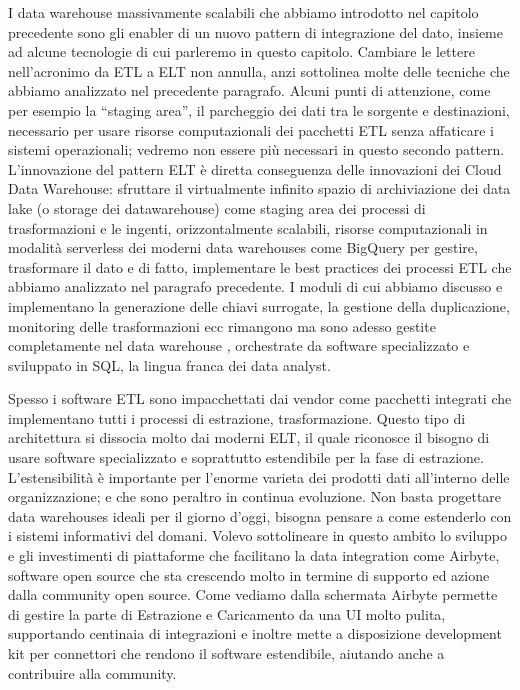\documentclass[a4paper,12pt]{report}
\begin{document}
I data warehouse massivamente scalabili che abbiamo introdotto nel capitolo precedente sono gli enabler di un nuovo pattern di integrazione del dato, insieme ad alcune tecnologie di cui parleremo in questo capitolo.
Cambiare le lettere nell’acronimo da ETL a ELT non annulla, anzi sottolinea molte delle tecniche che abbiamo analizzato nel precedente paragrafo.
\noindent
Alcuni punti di attenzione, come per esempio la “staging area”, il parcheggio dei dati tra le sorgente e destinazioni, necessario per usare risorse computazionali dei pacchetti ETL senza affaticare i sistemi operazionali; vedremo non essere più necessari in questo secondo pattern.
\noindent
L’innovazione del pattern ELT è diretta conseguenza delle innovazioni dei Cloud Data Warehouse: sfruttare il virtualmente infinito spazio di archiviazione dei data lake (o storage dei datawarehouse) come staging area dei processi di trasformazioni e le ingenti, orizzontalmente scalabili,  risorse computazionali in modalità serverless dei moderni data warehouses come BigQuery per gestire, trasformare il dato e di fatto, implementare le best practices dei processi ETL che abbiamo analizzato nel paragrafo precedente.
\noindent
I moduli di cui abbiamo discusso e implementano la generazione delle chiavi surrogate, la gestione della duplicazione, monitoring delle trasformazioni ecc rimangono ma sono adesso gestite completamente nel data warehouse , orchestrate da software specializzato e sviluppato in SQL, la lingua franca dei data analyst.

\noindent
Spesso i software ETL sono impacchettati dai vendor come pacchetti integrati che implementano tutti i processi di estrazione, trasformazione. Questo tipo di architettura si dissocia molto dai moderni ELT, il quale riconosce il bisogno di usare software specializzato e soprattutto estendibile per la fase di estrazione. L’estensibilità è importante per l’enorme varieta dei prodotti dati all’interno delle organizzazione; e che sono peraltro in continua evoluzione.
Non basta progettare data warehouses ideali per il giorno d’oggi, bisogna pensare a come estenderlo con i sistemi informativi del domani.
Volevo sottolineare in questo ambito lo sviluppo e gli investimenti di piattaforme che facilitano la data integration come Airbyte, software open source che sta crescendo molto in termine di supporto ed azione dalla community open source.
Come vediamo dalla schermata Airbyte permette di gestire la parte di Estrazione e Caricamento da una UI molto pulita, supportando centinaia di integrazioni e inoltre mette a disposizione development kit per connettori che rendono il software estendibile, aiutando anche a contribuire alla community.
\end{document}
